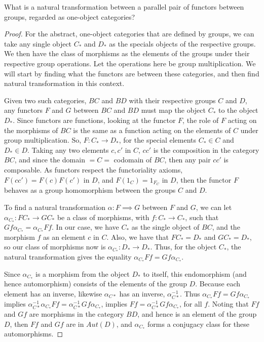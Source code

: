 \documentclass[main.tex]{subfiles}
\begin{document}
\begin{exercise}
	What is a natural transformation between a parallel pair of functors between
	groups, regarded as one-object categories?
\end{exercise}

\begin{proof}
	For the abstract, one-object categories that are defined by groups, we can
	take any single object $C_*$ and $D_*$ as the specials objects of the
	respective groups. We then have the class of morphisms as the elements of
	the groups under their respective group operations. Let the operations here
	be group multiplication. We will start by finding what the functors are
	between these categories, and then find natural transformation in this
	context.

	Given two such categories, $BC$ and $BD$ with their respective groups $C$
	and $D$, any functors $F$ and $G$ between $BC$ and $BD$ must map the object
	$C_*$ to the object $D_*$. Since functors are functions, looking at the
	functor $F$, the role of $F$ acting on the morphisms of $BC$ is the same as
	a function acting on the elements of $C$ under group multiplication. So, $F:
	C_* \rightarrow D_*$, for the special elements $C_* \in C$ and $D_* \in D$.
	Taking any two elements $c, c'$ in $C$, $cc'$ is the composition in the
	category $BC$, and since the domain $= C =$ codomain of $BC$, then any pair
	$cc'$ is composable. As functors respect the functoriality axioms, $F(cc') =
	F(c)F(c')$ in $D$, and $F(1_C) = 1_{F_C}$ in $D$, then the functor $F$
	behaves as a group homomorphism between the groups $C$ and $D$.

	To find a natural transformation $\alpha: F \implies G$ between $F$ and $G$,
	we can let $\alpha_{C_*}: FC_* \rightarrow GC_*$ be a class of morphisms,
	with $f: C_* \rightarrow C_*$, such that $Gf\alpha_{C_*} = \alpha_{C_*}Ff$.
	In our case, we have $C_*$ as the single object of $BC$, and the morphism
	$f$ as an element $c$ in $C$. Also, we have that $FC_* = D_*$ and $GC_* =
	D_*$, so our class of morphisms now is $\alpha_{C_*}: D_* \rightarrow D_*$.
	Thus, for the object $C_*$, the natural transformation gives the equality
	$\alpha_{C_*}Ff = Gf \alpha_{C_*}$.

	Since $\alpha_{C_*}$ is a morphism from the object $D_*$ to itself, this
	endomorphism (and hence automorphism) consists of the elements of the group
	$D$. Because each element has an inverse, likewise $\alpha_{C*}$ has an
	inverse, $\alpha_{C*}^{-1}$. Thus $\alpha_{C_*}Ff = Gf \alpha_{C_*}$ implies
	$\alpha_{C*}^{-1} \alpha_{C_*}Ff = \alpha_{C*}^{-1} Gf \alpha_{C_*}$,
	implies $Ff = \alpha_{C*}^{-1} Gf \alpha_{C_*}$, for all $f$. Noting that
	$Ff$ and $Gf$ are morphisms in the category $BD$, and hence is an element of
	the group $D$, then $Ff$ and $Gf$ are in $Aut(D)$, and $\alpha_{C_*}$ forms
	a conjugacy class for these automorphisms.
\end{proof}
\end{document}
